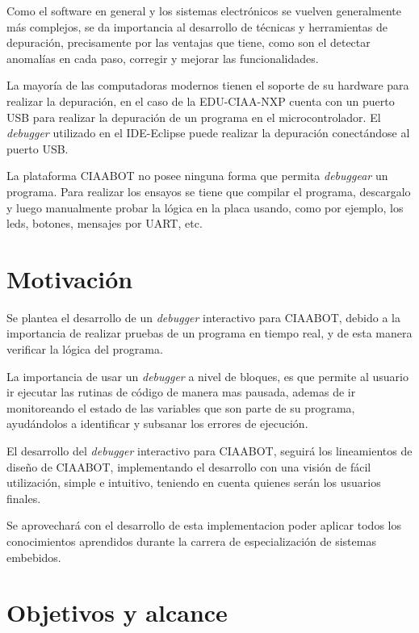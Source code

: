 Como el software en general y los sistemas electrónicos se vuelven generalmente
más complejos, se da importancia al desarrollo de técnicas y herramientas de depuración,
precisamente por las ventajas que tiene, como son el detectar anomalías
en cada paso, corregir y mejorar las funcionalidades. 

La mayoría de las computadoras modernos tienen el soporte de su hardware para
realizar la depuración, en el caso de la EDU-CIAA-NXP cuenta con un puerto USB
para realizar la depuración de un programa en el microcontrolador. El \emph{debugger}
utilizado en el IDE-Eclipse puede realizar la depuración conectándose al puerto
USB.

La plataforma CIAABOT no posee ninguna forma que permita \emph{debuggear} un programa.
Para realizar los ensayos se tiene que compilar el programa, descargalo y luego manualmente probar la lógica en la placa usando, como por ejemplo, los leds, botones, mensajes por UART, etc.



\section{Motivación}
\label{Motivación}

Se plantea el desarrollo de un \emph{debugger} interactivo para CIAABOT, debido a la
importancia de realizar pruebas de un programa en tiempo real, y de esta manera verificar la lógica del programa.

La importancia de usar un \emph{debugger} a nivel de bloques, es que permite al usuario
ir ejecutar las rutinas de código de manera mas pausada, ademas de ir monitoreando
el estado de las variables que son parte de su programa, ayudándolos a
identificar y subsanar los errores de ejecución.

El desarrollo del \emph{debugger} interactivo para CIAABOT, seguirá los lineamientos
de diseño de CIAABOT, implementando el desarrollo con una visión de
fácil utilización, simple e intuitivo, teniendo en cuenta quienes serán los usuarios
finales.

Se aprovechará con el desarrollo de esta implementacion poder aplicar todos los
conocimientos aprendidos durante la carrera de especialización de sistemas embebidos.



\section{Objetivos y alcance}
\label{Objetivos y alcance}

